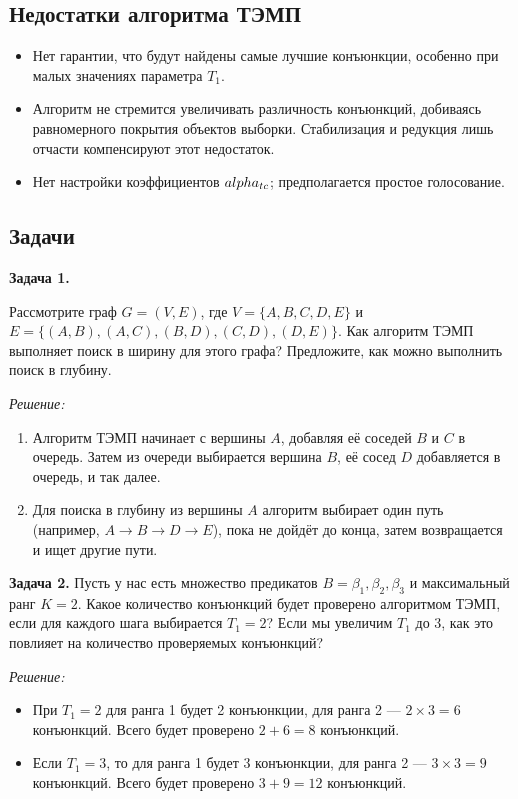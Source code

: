 \subsection{Недостатки алгоритма ТЭМП}

\begin{itemize}
    \item Нет гарантии, что будут найдены самые лучшие конъюнкции, особенно при малых значениях параметра $T_1$.
    \item Алгоритм не стремится увеличивать различность конъюнкций, добиваясь равномерного покрытия объектов выборки. Стабилизация и редукция лишь отчасти компенсируют этот недостаток.
    \item Нет настройки коэффициентов $\\alpha_{tc}$; предполагается простое голосование.
\end{itemize}

\subsection{Задачи}

    \textbf{Задача 1.}

    \newline
    Рассмотрите граф $G = (V, E)$, где $V = \{A, B, C, D, E\}$ и $E = \{(A, B), (A, C), (B, D), (C, D), (D, E)\}$. Как алгоритм ТЭМП выполняет поиск в ширину для этого графа? Предложите, как можно выполнить поиск в глубину.

\textit{Решение:}
\begin{enumerate}
    \item Алгоритм ТЭМП начинает с вершины $A$, добавляя её соседей $B$ и $C$ в очередь. Затем из очереди выбирается вершина $B$, её сосед $D$ добавляется в очередь, и так далее.
    \item Для поиска в глубину из вершины $A$ алгоритм выбирает один путь (например, $A \to B \to D \to E$), пока не дойдёт до конца, затем возвращается и ищет другие пути.
\end{enumerate}

\textbf{Задача 2.}
\newline
Пусть у нас есть множество предикатов $B = \beta_1, \beta_2, \beta_3$ и максимальный ранг $K = 2$. Какое количество конъюнкций будет проверено алгоритмом ТЭМП, если для каждого шага выбирается $T_1 = 2$? Если мы увеличим $T_1$ до 3, как это повлияет на количество проверяемых конъюнкций?

\textit{Решение:}
\begin{itemize}
    \item При $T_1 = 2$ для ранга 1 будет 2 конъюнкции, для ранга 2 --- $2 \times 3 = 6$ конъюнкций. Всего будет проверено $2 + 6 = 8$ конъюнкций.
    \item Если $T_1 = 3$, то для ранга 1 будет 3 конъюнкции, для ранга 2 --- $3 \times 3 = 9$ конъюнкций. Всего будет проверено $3 + 9 = 12$ конъюнкций.
\end{itemize}

